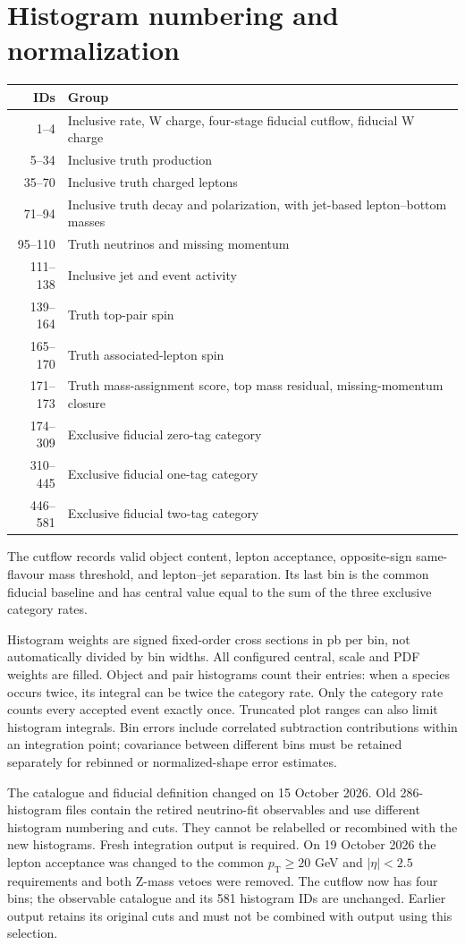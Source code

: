 \documentclass[10pt,a4paper]{article}
\newcommand{\pt}{p_{\mathrm T}}
\begin{document}
\section{Histogram numbering and normalization}
\begin{center}
\begin{tabular}{rl}
\toprule IDs & Group\\ \midrule
1--4 & Inclusive rate, W charge, four-stage fiducial cutflow, fiducial W charge\\
5--34 & Inclusive truth production\\
35--70 & Inclusive truth charged leptons\\
71--94 & Inclusive truth decay and polarization, with jet-based lepton--bottom masses\\
95--110 & Truth neutrinos and missing momentum\\
111--138 & Inclusive jet and event activity\\
139--164 & Truth top-pair spin\\
165--170 & Truth associated-lepton spin\\
171--173 & Truth mass-assignment score, top mass residual, missing-momentum closure\\
174--309 & Exclusive fiducial zero-tag category\\
310--445 & Exclusive fiducial one-tag category\\
446--581 & Exclusive fiducial two-tag category\\
\bottomrule
\end{tabular}
\end{center}
The cutflow records valid object content, lepton acceptance, opposite-sign
same-flavour mass threshold, and lepton--jet separation.
Its last bin is the common fiducial baseline and
has central value equal to the sum of the three exclusive category rates.

Histogram weights are signed fixed-order cross sections in pb per bin,
not automatically divided by bin widths. All configured central, scale and
PDF weights are filled. Object and pair histograms count their entries:
when a species occurs twice, its integral can be twice the category rate.
Only the category rate counts every accepted event exactly once. Truncated
plot ranges can also limit histogram integrals. Bin errors include
correlated subtraction contributions within an integration point; covariance
between different bins must be retained separately for rebinned or
normalized-shape error estimates.

The catalogue and fiducial definition changed on 15 October 2026. Old
286-histogram files contain the retired neutrino-fit observables and use
different histogram numbering and cuts. They cannot be relabelled or
recombined with the new histograms. Fresh integration output is required.
On 19 October 2026 the lepton acceptance was changed to the common
$\pt\geq20$ GeV and $|\eta|<2.5$ requirements and both Z-mass vetoes were
removed. The cutflow now has four bins; the observable catalogue and its
581 histogram IDs are unchanged. Earlier output retains its original cuts
and must not be combined with output using this selection.
\end{document}
